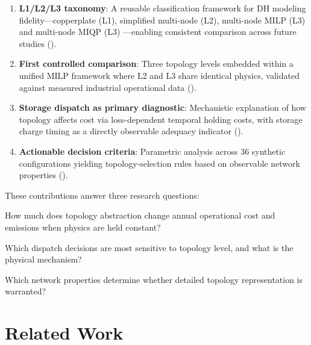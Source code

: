 \documentclass[review,3p]{elsarticle}
\begin{document}
\begin{enumerate}
    \item \textbf{L1/L2/L3 taxonomy}: A reusable classification
    framework for DH modeling fidelity---copperplate (L1), simplified
    multi-node (L2), multi-node MILP (L3) and multi-node MIQP (L3) ---enabling
    consistent comparison across future studies ().

    \item \textbf{First controlled comparison}: Three topology levels
    embedded within a unified MILP framework where L2 and L3 share
    identical physics, validated against measured industrial operational
    data ().

    \item \textbf{Storage dispatch as primary diagnostic}: Mechanistic
    explanation of how topology affects cost via loss-dependent temporal
    holding costs, with storage charge timing as a directly observable
    adequacy indicator ().

    \item \textbf{Actionable decision criteria}: Parametric analysis
    across 36 synthetic configurations yielding topology-selection
    rules based on observable network properties
    ().
\end{enumerate}

These contributions answer three research questions:
\begin{description}[style=nextline,nosep]
    \item[RQ1 --- Cost Impact:]
    How much does topology abstraction change annual operational cost
    and  emissions when physics are held constant?

    \item[RQ2 --- Dispatch Sensitivity:]
    Which dispatch decisions are most sensitive to topology level,
    and what is the physical mechanism?

    \item[RQ3 --- Generalizability:]
    Which network properties determine whether detailed topology
    representation is warranted?
\end{description}

\section{Related Work}
\label{sec:related_work}
\end{document}
